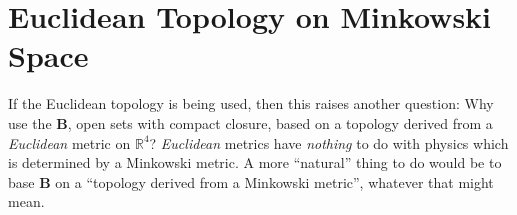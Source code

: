 \section{Euclidean Topology on Minkowski Space}\label{sctn:euclidean-topology-on-minkowski-space}
If the Euclidean topology is being used, then this raises another question: Why use the $\mathbf{B}$, open sets with compact closure, based on a topology derived from a \textit{Euclidean} metric on $\mathbb{R}^4$?  \textit{Euclidean} metrics have \textit{nothing} to do with physics which is determined by a Minkowski metric. A more ``natural'' thing to do would be to base $\mathbf{B}$ on a ``topology derived from a Minkowski metric'', whatever that might mean.
